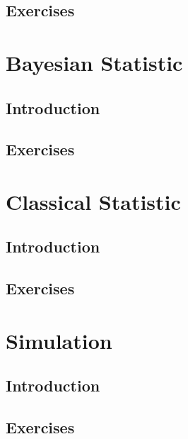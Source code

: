 \documentclass[10pt]{book}
\begin{document}
	\chapter{Exercises}

\part{Bayesian Statistic}
	\chapter{Introduction}

	\chapter{Exercises}

\part{Classical Statistic}
	\chapter{Introduction}

	\chapter{Exercises}

\part{Simulation}
	\chapter{Introduction}

	\chapter{Exercises}
\end{document}
